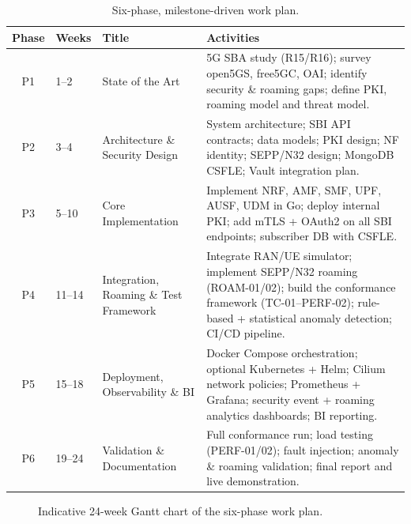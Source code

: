 \documentclass[11pt,a4paper]{report}
\begin{document}
\begin{table}[h]
\centering
\footnotesize
\renewcommand{\arraystretch}{1.3}
\begin{tabularx}{\linewidth}{@{}c l l X@{}}
\toprule
\textbf{Phase} & \textbf{Weeks} & \textbf{Title} & \textbf{Activities}\\
\midrule
P1 & 1--2   & State of the Art &
  5G SBA study (R15/R16); survey open5GS, free5GC, OAI; identify security \& roaming gaps;
  define PKI, roaming model and threat model.\\
P2 & 3--4   & Architecture \& Security Design &
  System architecture; SBI API contracts; data models; PKI design; NF identity; SEPP/N32
  design; MongoDB CSFLE; Vault integration plan.\\
P3 & 5--10  & Core Implementation &
  Implement NRF, AMF, SMF, UPF, AUSF, UDM in Go; deploy internal PKI; add mTLS + OAuth2 on
  all SBI endpoints; subscriber DB with CSFLE.\\
P4 & 11--14 & Integration, Roaming \& Test Framework &
  Integrate RAN/UE simulator; implement SEPP/N32 roaming (ROAM-01/02); build the
  conformance framework (TC-01--PERF-02); rule-based + statistical anomaly detection;
  CI/CD pipeline.\\
P5 & 15--18 & Deployment, Observability \& BI &
  Docker Compose orchestration; optional Kubernetes + Helm; Cilium network policies;
  Prometheus + Grafana; security event + roaming analytics dashboards; BI reporting.\\
P6 & 19--24 & Validation \& Documentation &
  Full conformance run; load testing (PERF-01/02); fault injection; anomaly \& roaming
  validation; final report and live demonstration.\\
\bottomrule
\end{tabularx}
\caption{Six-phase, milestone-driven work plan.}
\label{tab:plan}
\end{table}

\begin{figure}[h]
\centering
{}
\caption{Indicative 24-week Gantt chart of the six-phase work plan.}
\label{fig:gantt}
\end{figure}
\end{document}
